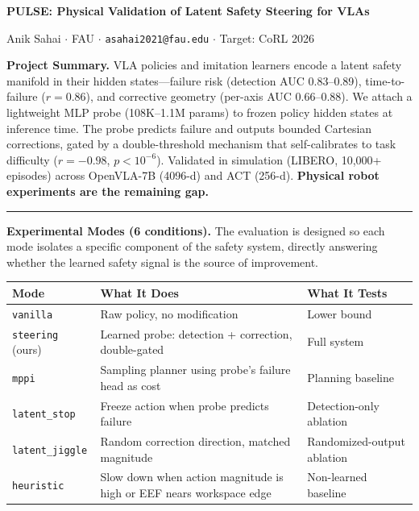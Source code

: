 \documentclass[10pt]{article}
\begin{document}
{\centering\Large\bfseries PULSE: Physical Validation of Latent Safety Steering for VLAs\par}
\vspace{2pt}
{\centering\small Anik Sahai $\cdot$ FAU $\cdot$ \texttt{asahai2021@fau.edu} $\cdot$ Target: CoRL 2026\par}
\vspace{6pt}

\textbf{Project Summary.} VLA policies and imitation learners encode a latent safety manifold in their hidden states---failure risk (detection AUC 0.83--0.89), time-to-failure ($r{=}0.86$), and corrective geometry (per-axis AUC 0.66--0.88). We attach a lightweight MLP probe (108K--1.1M params) to frozen policy hidden states at inference time. The probe predicts failure and outputs bounded Cartesian corrections, gated by a double-threshold mechanism that self-calibrates to task difficulty ($r{=}{-}0.98$, $p{<}10^{-6}$). Validated in simulation (LIBERO, 10,000+ episodes) across OpenVLA-7B (4096-d) and ACT (256-d). \textbf{Physical robot experiments are the remaining gap.}

\vspace{2pt}
\hrule
\vspace{4pt}

\textbf{Experimental Modes (6 conditions).} The evaluation is designed so each mode isolates a specific component of the safety system, directly answering whether the learned safety signal is the source of improvement.

\vspace{-2pt}
{\small
\begin{tabular}{@{}p{2.8cm}p{8.2cm}p{4cm}@{}}
\toprule
\textbf{Mode} & \textbf{What It Does} & \textbf{What It Tests} \\
\midrule
\texttt{vanilla} & Raw policy, no modification & Lower bound \\
\texttt{steering} (ours) & Learned probe: detection + correction, double-gated & Full system \\
\texttt{mppi} & Sampling planner using probe's failure head as cost & Planning baseline \\
\texttt{latent\_stop} & Freeze action when probe predicts failure & Detection-only ablation \\
\texttt{latent\_jiggle} & Random correction direction, matched magnitude & Randomized-output ablation \\
\texttt{heuristic} & Slow down when action magnitude is high or EEF nears workspace edge & Non-learned baseline \\
\bottomrule
\end{tabular}
}
\end{document}
